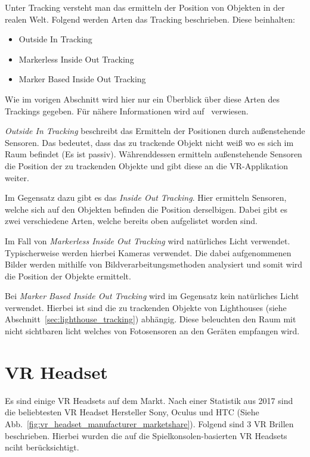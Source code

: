 Unter Tracking versteht man das ermitteln der Position von Objekten in der realen Welt.
Folgend werden Arten das Tracking beschrieben.
Diese beinhalten:

\begin{itemize}
    \item Outside In Tracking
    \item Markerless Inside Out Tracking
    \item Marker Based Inside Out Tracking
\end{itemize}

Wie im vorigen Abschnitt wird hier nur ein Überblick über diese Arten des Trackings gegeben.
Für nähere Informationen wird auf~\cite{Dennis_Ziesecke_2019} verwiesen.

\emph{Outside In Tracking} beschreibt das Ermitteln der Positionen durch außenstehende Sensoren.
Das bedeutet, dass das zu trackende Objekt nicht weiß wo es sich im Raum befindet (Es ist passiv).
Währenddessen ermitteln außenstehende Sensoren die Position der zu trackenden Objekte und gibt diese an die VR-Applikation weiter.

Im Gegensatz dazu gibt es das \emph{Inside Out Tracking}.
Hier ermitteln Sensoren, welche sich auf den Objekten befinden die Position derselbigen.
Dabei gibt es zwei verschiedene Arten, welche bereits oben aufgelistet worden sind.

Im Fall von \emph{Markerless Inside Out Tracking} wird natürliches Licht verwendet.
Typischerweise werden hierbei Kameras verwendet.
Die dabei aufgenommenen Bilder werden mithilfe von Bildverarbeitungsmethoden analysiert und somit wird die Position der Objekte ermittelt.

Bei \emph{Marker Based Inside Out Tracking} wird im Gegensatz kein natürliches Licht verwendet.
Hierbei ist sind die zu trackenden Objekte von Lighthouses (siehe Abschnitt~\ref{sec:lighthouse_tracking}) abhängig.
Diese beleuchten den Raum mit nicht sichtbaren licht welches von Fotosensoren an den Geräten empfangen wird.

\section{VR Headset}
\label{sec:vr-headset}

Es sind einige VR Headsets auf dem Markt.
Nach einer Statistik aus 2017 sind die beliebtesten VR Headset Hersteller Sony, Oculus und HTC (Siehe Abb.~\ref{fig:vr_headset_manufacturer_marketshare}).
Folgend sind 3 VR Brillen beschrieben.
Hierbei wurden die auf die Spielkonsolen-basierten VR Headsets nciht berücksichtigt.

